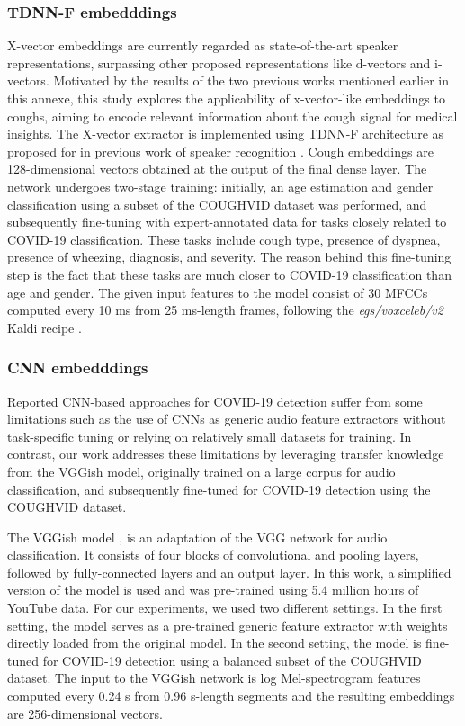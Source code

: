 \subsubsection{TDNN-F embedddings}
X-vector embeddings are currently regarded as state-of-the-art speaker representations, surpassing other proposed representations like d-vectors and i-vectors. Motivated by the results of the two previous works mentioned earlier in this annexe, this study explores the applicability of x-vector-like embeddings to coughs, aiming to encode relevant information about the cough signal for medical insights.
The X-vector extractor is implemented using \ac{TDNN-F} architecture as proposed for in previous work of speaker recognition \cite{villalbaSRE182020}. Cough embeddings are 128-dimensional vectors obtained at the output of the final dense layer. The network undergoes two-stage training: initially, an age estimation and gender classification using a subset of the COUGHVID dataset was performed, and subsequently fine-tuning with expert-annotated data for tasks closely related to COVID-19 classification. These tasks include cough type, presence of dyspnea, presence of wheezing, diagnosis, and severity. The reason behind this fine-tuning step is the fact that these tasks are much closer to COVID-19 classification than age and gender. The given input features to the model consist of 30 \acp{MFCC} computed every 10 ms from 25 ms-length frames, following the \textit{egs/voxceleb/v2} Kaldi recipe \cite{kaldi}.

\subsubsection{CNN embedddings}
Reported \ac{CNN}-based approaches for COVID-19 detection suffer from some limitations such as the use of \acp{CNN} as generic audio feature extractors without task-specific tuning or relying on relatively small datasets for training. In contrast, our work addresses these limitations by leveraging transfer knowledge from the VGGish model, originally trained on a large corpus for audio classification, and subsequently fine-tuned for COVID-19 detection using the COUGHVID dataset.

The VGGish model \cite{Hershey2017}, is an adaptation of the VGG network \cite{Simonyan2015} for audio classification. It consists of four blocks of convolutional and pooling layers, followed by fully-connected layers and an output layer. In this work, a simplified version of the model is used and was pre-trained using 5.4 million hours of YouTube data. For our experiments, we used two different settings. In the first setting, the model serves as a pre-trained generic feature extractor with weights directly loaded from the original model. In the second setting, the model is fine-tuned for COVID-19 detection using a balanced subset of the COUGHVID dataset. The input to the VGGish network is log Mel-spectrogram features computed every 0.24 s from 0.96 s-length segments and the resulting embeddings are 256-dimensional vectors.

